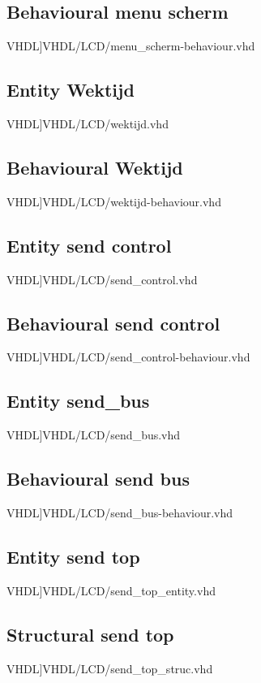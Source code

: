 \subsection{Behavioural menu scherm}
\scriptsize 
 VHDL]{VHDL/LCD/menu_scherm-behaviour.vhd}
\normalsize
\label{code:beh_menu_scherm}
\subsection{Entity Wektijd}
\scriptsize 
 VHDL]{VHDL/LCD/wektijd.vhd}
\normalsize
\label{code:ent_wektijd}
\subsection{Behavioural Wektijd}
\scriptsize 
 VHDL]{VHDL/LCD/wektijd-behaviour.vhd}
\normalsize
\label{code:beh_wektijd}
\subsection{Entity send control}
\scriptsize 
 VHDL]{VHDL/LCD/send_control.vhd}
\normalsize
\label{code:ent_send_control}
\subsection{Behavioural send control}
\scriptsize 
 VHDL]{VHDL/LCD/send_control-behaviour.vhd}
\normalsize
\label{code:beh_send_control}
\subsection{Entity send\_bus}
\scriptsize 
 VHDL]{VHDL/LCD/send_bus.vhd}
\normalsize
\label{code:ent_send_bus}
\subsection{Behavioural send bus}
\scriptsize 
 VHDL]{VHDL/LCD/send_bus-behaviour.vhd}
\normalsize
\label{code:beh_send_bus}\\
\subsection{Entity send top}
\scriptsize 
 VHDL]{VHDL/LCD/send_top_entity.vhd}
\normalsize
\label{code:ent_send_top}
\subsection{Structural send top}
\scriptsize 
 VHDL]{VHDL/LCD/send_top_struc.vhd}
\normalsize
\label{code:struc_send_top}
